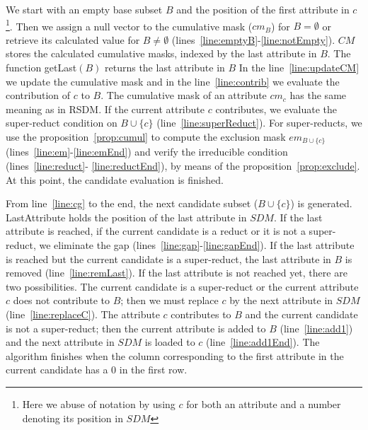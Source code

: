 \documentclass[authoryear,11pt]{elsarticle}
\begin{document}
	We start with an empty base subset $B$ and the position of the first attribute in $c$\footnote{Here we 
	abuse of notation by using $c$ for both an attribute and a number denoting its position in $SDM$}. Then
	we assign a null vector to the cumulative mask ($cm_B$) for $B=\emptyset$ or retrieve its calculated value
	for	$B\neq \emptyset$ (lines~\ref{line:emptyB}-\ref{line:notEmpty}). $CM$ stores the calculated cumulative 
	masks, indexed by the last attribute in $B$.	The function getLast$(B)$ returns the last attribute in $B$
	In the line~\ref{line:updateCM} we update the cumulative mask and in
	the line~\ref{line:contrib} we evaluate the contribution of $c$ to $B$. The cumulative mask of an 
	attribute $cm_c$ has the same meaning as in RSDM. If the current attribute $c$ contributes, we evaluate
	the super-reduct condition on $B\cup \lbrace c\rbrace$ (line~\ref{line:superReduct}). For super-reducts,
	we use the proposition~\ref{prop:cumul} to compute the exclusion mask $em_{B\cup \lbrace c\rbrace}$ 
	(lines~\ref{line:em}-\ref{line:emEnd}) and verify the irreducible condition (lines~\ref{line:reduct}-
	\ref{line:reductEnd}), by means of the proposition~\ref{prop:exclude}. At this point, the candidate 
	evaluation is finished.
	
	From line~\ref{line:cg} to the end, the next candidate subset ($B\cup \lbrace c\rbrace$) is generated. 
	LastAttribute holds the position of the last attribute in $SDM$. If the last attribute is
	reached, if the current candidate is a reduct or it is not a super-reduct, we eliminate the gap
	(lines~\ref{line:gap}-\ref{line:gapEnd}). If the last attribute is reached but the current candidate is 
	a super-reduct, the last attribute in $B$ is removed (line~\ref{line:remLast}). If the last attribute is 
	not reached yet, there are two possibilities. The current candidate is a super-reduct or the current
	attribute $c$ does not contribute to $B$; then we must replace $c$ by the next attribute in $SDM$
	(line~\ref{line:replaceC}). The attribute $c$ contributes to $B$ and the current candidate is not a 
	super-reduct; then the current attribute is added to $B$ (line~\ref{line:add1}) and the next attribute in 
	$SDM$ is loaded to $c$ (line~\ref{line:add1End}). The algorithm finishes when the column corresponding 
	to the first attribute in the current candidate has a 0 in the first row.
	
\end{document}
